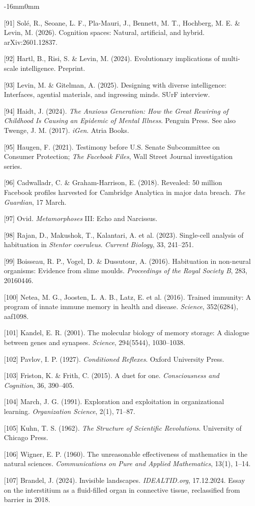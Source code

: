 \documentclass[10pt,oneside]{book}
\newcommand{\refentry}[1]{%
  \par\addvspace{0pt}%
  \begingroup\footnotesize\linespread{0.92}\selectfont
  \noindent\hangindent=4mm\hangafter=1 #1\par%
  \endgroup
}
\newenvironment{widebody}{%
  \begin{adjustwidth}{-16mm}{0mm}%
}{%
  \end{adjustwidth}%
}
\begin{document}
\begin{widebody}
\refentry{[91] Sol{\'e}, R., Seoane, L. F., Pla-Mauri, J., Bennett, M. T., Hochberg, M. E. \& Levin, M. (2026). Cognition spaces: Natural, artificial, and hybrid. arXiv:2601.12837.}
\refentry{[92] Hartl, B., Risi, S. \& Levin, M. (2024). Evolutionary implications of multi-scale intelligence. Preprint.}
\refentry{[93] Levin, M. \& Gitelman, A. (2025). Designing with diverse intelligence: Interfaces, agential materials, and ingressing minds. SUrF interview.}
\refentry{[94] Haidt, J. (2024). \textit{The Anxious Generation: How the Great Rewiring of Childhood Is Causing an Epidemic of Mental Illness}. Penguin Press. See also Twenge, J. M. (2017). \textit{iGen}. Atria Books.}
\refentry{[95] Haugen, F. (2021). Testimony before U.S. Senate Subcommittee on Consumer Protection; \textit{The Facebook Files}, Wall Street Journal investigation series.}
\refentry{[96] Cadwalladr, C. \& Graham-Harrison, E. (2018). Revealed: 50 million Facebook profiles harvested for Cambridge Analytica in major data breach. \textit{The Guardian}, 17 March.}
\refentry{[97] Ovid. \textit{Metamorphoses} III: Echo and Narcissus.}
\refentry{[98] Rajan, D., Makushok, T., Kalantari, A. et al. (2023). Single-cell analysis of habituation in \textit{Stentor coeruleus}. \textit{Current Biology}, 33, 241--251.}
\refentry{[99] Boisseau, R. P., Vogel, D. \& Dussutour, A. (2016). Habituation in non-neural organisms: Evidence from slime moulds. \textit{Proceedings of the Royal Society B}, 283, 20160446.}
\refentry{[100] Netea, M. G., Joosten, L. A. B., Latz, E. et al. (2016). Trained immunity: A program of innate immune memory in health and disease. \textit{Science}, 352(6284), aaf1098.}
\refentry{[101] Kandel, E. R. (2001). The molecular biology of memory storage: A dialogue between genes and synapses. \textit{Science}, 294(5544), 1030--1038.}
\refentry{[102] Pavlov, I. P. (1927). \textit{Conditioned Reflexes}. Oxford University Press.}
\refentry{[103] Friston, K. \& Frith, C. (2015). A duet for one. \textit{Consciousness and Cognition}, 36, 390--405.}
\refentry{[104] March, J. G. (1991). Exploration and exploitation in organizational learning. \textit{Organization Science}, 2(1), 71--87.}
\refentry{[105] Kuhn, T. S. (1962). \textit{The Structure of Scientific Revolutions}. University of Chicago Press.}
\refentry{[106] Wigner, E. P. (1960). The unreasonable effectiveness of mathematics in the natural sciences. \textit{Communications on Pure and Applied Mathematics}, 13(1), 1--14.}
\refentry{[107] Brandel, J. (2024). Invisible landscapes. \textit{IDEALTID.org}, 17.12.2024. Essay on the interstitium as a fluid-filled organ in connective tissue, reclassified from barrier in 2018.}
\end{widebody}
\end{document}
